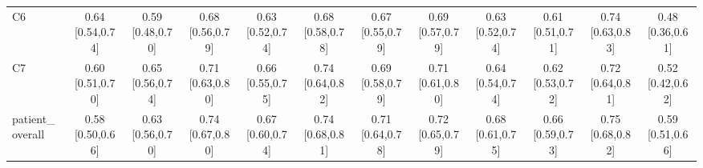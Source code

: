 \begin{tabular}{lccccccccccc}
C6 & 0.64 [0.54,0.74] & 0.59 [0.48,0.70] & 0.68 [0.56,0.79] & 0.63 [0.52,0.74] & 0.68 [0.58,0.78] & 0.67 [0.55,0.79] & 0.69 [0.57,0.79] & 0.63 [0.52,0.74] & 0.61 [0.51,0.71] & 0.74 [0.63,0.83] & 0.48 [0.36,0.61] \\
C7 & 0.60 [0.51,0.70] & 0.65 [0.56,0.74] & 0.71 [0.63,0.80] & 0.66 [0.55,0.75] & 0.74 [0.64,0.82] & 0.69 [0.58,0.79] & 0.71 [0.61,0.80] & 0.64 [0.54,0.74] & 0.62 [0.53,0.72] & 0.72 [0.64,0.81] & 0.52 [0.42,0.62] \\
patient\_overall & 0.58 [0.50,0.66] & 0.63 [0.56,0.70] & 0.74 [0.67,0.80] & 0.67 [0.60,0.74] & 0.74 [0.68,0.81] & 0.71 [0.64,0.78] & 0.72 [0.65,0.79] & 0.68 [0.61,0.75] & 0.66 [0.59,0.73] & 0.75 [0.68,0.82] & 0.59 [0.51,0.66] \\
\bottomrule
\end{tabular}
